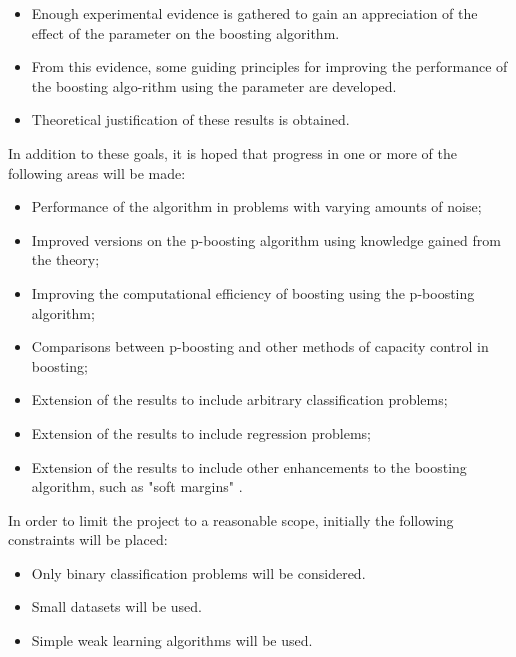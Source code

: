 \begin{itemize}
\item	Enough experimental evidence is gathered to gain an
	appreciation of the effect of the   parameter on the boosting
	algorithm.

\item	From this evidence, some guiding principles for improving the
	performance of the boosting algo-rithm using the   parameter
	are developed.

\item	Theoretical justification of these results is obtained.
\end{itemize}

In addition to these goals, it is hoped that progress in one or more of the following areas will be made:

\begin{itemize}
\item	Performance of the algorithm in problems with varying amounts
	of noise;

\item	Improved versions on the p-boosting algorithm using knowledge
	gained from the theory;

\item	Improving the computational efficiency of boosting using the
	p-boosting algorithm;

\item	Comparisons between p-boosting and other methods of capacity
	control in boosting;

\item	Extension of the results to include arbitrary classification
	problems;

\item	Extension of the results to include regression problems;

\item	Extension of the results to include other enhancements to the
	boosting algorithm, such as "soft margins" \cite{Ratsch98}.
\end{itemize}

In order to limit the project to a reasonable scope, initially the following constraints will be placed:

\begin{itemize}
\item	Only binary classification problems will be considered.

\item	Small datasets will be used.

\item	Simple weak learning algorithms will be used.
\end{itemize}


